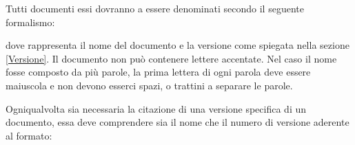 \documentclass[12pt,a4paper]{article}
\begin{document}
Tutti documenti essi dovranno a essere denominati secondo il seguente formalismo:
\begin{center}
\end{center}
dove  rappresenta il nome del documento e  la versione come spiegata nella sezione \ref{Versione}. Il documento non può contenere lettere accentate. Nel caso il nome fosse composto da più parole, la prima lettera di ogni parola deve essere maiuscola e non devono esserci spazi,  o trattini a separare le parole.

Ogniqualvolta sia necessaria la citazione di una versione specifica di un documento, essa deve comprendere sia il nome che il numero di versione aderente al formato:
\begin{center}
\end{center}
\end{document}
